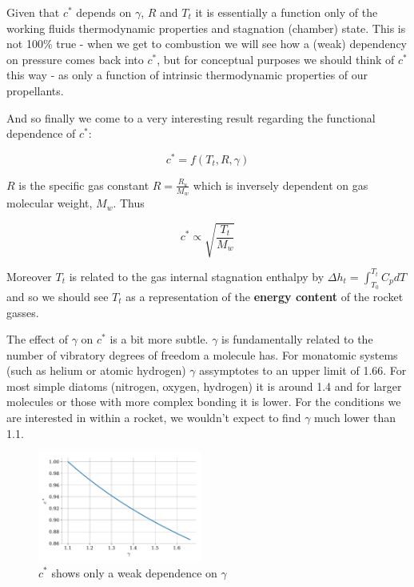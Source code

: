 \documentclass[twocolumn]{memoir} %
\begin{document}
Given that $c^*$ depends on $\gamma$, $R$ and $T_t$ it is essentially a function only of the working fluids thermodynamic properties and stagnation (chamber) state.  This is not 100\% true - when we get to combustion we will see how a (weak) dependency on pressure comes back into $c^*$, but for conceptual purposes we should think of $c^*$ this way - as only a function of intrinsic thermodynamic properties of our propellants.

And so finally we come to a very interesting result regarding the
functional dependence of $c^*$:

\begin{equation}c^* = f(T_t, R, \gamma)
\end{equation}

$R$ is the specific gas constant $R = \frac{R_u}{M_w}$ which is
inversely dependent on gas molecular weight, $M_w$. Thus

\begin{equation}c^* \propto \sqrt{\frac{T_t}{M_w}}
\end{equation}

Moreover $T_t$ is related to the gas internal stagnation enthalpy by
$\Delta h_t = \int_{T_0}^{T_t} C_p dT$ and so we should see $T_t$ as
a representation of the \textbf{energy content} of the rocket gasses.

The effect of $\gamma$ on $c^*$ is a bit more subtle. $\gamma$ is
fundamentally related to the number of vibratory degrees of freedom a
molecule has. For monatomic systems (such as helium or atomic hydrogen)
$\gamma$ assymptotes to an upper limit of 1.66. For most simple
diatoms (nitrogen, oxygen, hydrogen) it is around 1.4 and for larger
molecules or those with more complex bonding it is lower. For the
conditions we are interested in within a rocket, we wouldn't expect to
find $\gamma$ much lower than 1.1.

\begin{figure}[H]
    \includegraphics[width=0.48\textwidth]{imgs/cstar_gamma.pdf}
    \caption{$c^*$ shows only a weak dependence on $\gamma$}
\end{figure}
\end{document}

